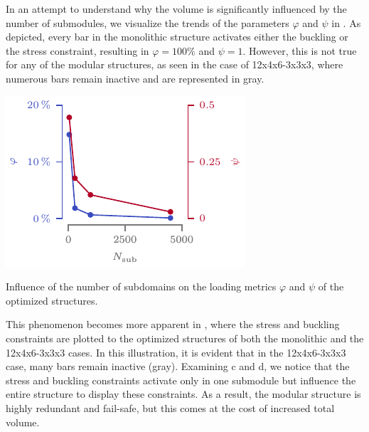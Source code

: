    In an attempt to understand why the volume is significantly influenced by the number of submodules, we visualize the trends of the parameters $\varphi$ and $\psi$ in . As depicted, every bar in the monolithic structure activates either the buckling or the stress constraint, resulting in $\varphi=100\%$ and $\psi=1$. However, this is not true for any of the modular structures, as seen in the case of 12x4x6-3x3x3, where numerous bars remain inactive and are represented in gray.
    \begin{marginfigure}
        \centering
        \includegraphics[width=\linewidth]{figures/05_cellular_opt/00_module_scale_tab/scale_tab_param.pdf}
        \caption{Influence of the number of subdomains on the loading metrics $\varphi$ and $\psi$ of the optimized structures.}
        \label{fig:05_scale_param}
    \end{marginfigure}
    This phenomenon becomes more apparent in , where the stress and buckling constraints are plotted to the optimized structures of both the monolithic and the 12x4x6-3x3x3 cases. In this illustration, it is evident that in the 12x4x6-3x3x3 case, many bars remain inactive (gray). Examining c and d, we notice that the stress and buckling constraints activate only in one submodule but influence the entire structure to display these constraints. As a result, the modular structure is highly redundant and fail-safe, but this comes at the cost of increased total volume.
